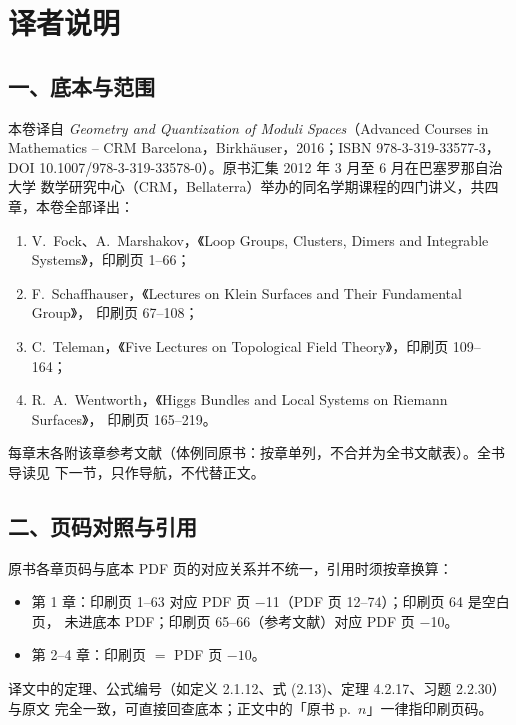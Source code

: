 \chapter*{译者说明}

\section*{一、底本与范围}

本卷译自 \emph{Geometry and Quantization of Moduli Spaces}（Advanced Courses in
Mathematics -- CRM Barcelona，Birkhäuser，2016；ISBN 978-3-319-33577-3，
DOI 10.1007/978-3-319-33578-0）。原书汇集 2012 年 3 月至 6 月在巴塞罗那自治大学
数学研究中心（CRM，Bellaterra）举办的同名学期课程的四门讲义，共四章，本卷全部译出：

\begin{enumerate}[label=\arabic*., leftmargin=2.2em, itemsep=0.15em]
\item V.~Fock、A.~Marshakov，《Loop Groups, Clusters, Dimers and Integrable
      Systems》，印刷页 1--66；
\item F.~Schaffhauser，《Lectures on Klein Surfaces and Their Fundamental Group》，
      印刷页 67--108；
\item C.~Teleman，《Five Lectures on Topological Field Theory》，印刷页 109--164；
\item R.~A.~Wentworth，《Higgs Bundles and Local Systems on Riemann Surfaces》，
      印刷页 165--219。
\end{enumerate}

每章末各附该章参考文献（体例同原书：按章单列，不合并为全书文献表）。全书导读见
下一节，只作导航，不代替正文。

\section*{二、页码对照与引用}

原书各章页码与底本 PDF 页的对应关系并不统一，引用时须按章换算：

\begin{itemize}[leftmargin=1.6em, itemsep=0.2em]
\item 第 1 章：印刷页 1--63 对应 PDF 页 $-$11（PDF 页 12--74）；印刷页 64 是空白页，
      未进底本 PDF；印刷页 65--66（参考文献）对应 PDF 页 $-$10。
\item 第 2--4 章：印刷页 $=$ PDF 页 $-10$。
\end{itemize}

译文中的定理、公式编号（如定义 2.1.12、式 (2.13)、定理 4.2.17、习题 2.2.30）与原文
完全一致，可直接回查底本；正文中的「原书 p.~$n$」一律指印刷页码。

